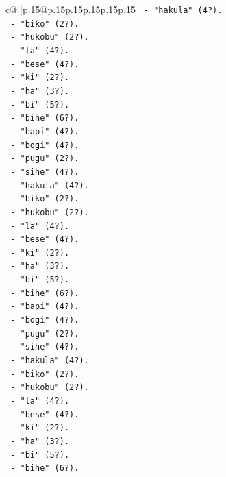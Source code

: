 \documentclass{article}
\begin{document}
{\begin{supertabular}{c@{$\;$}|p{.15\linewidth}@{}p{.15\linewidth}p{.15\linewidth}p{.15\linewidth}p{.15\linewidth}p{.15\linewidth}}
{{{\texttt{       {-} "hakula" (4?).} \\
\texttt{       {-} "biko" (2?).} \\
\texttt{       {-} "hukobu" (2?).} \\
\texttt{       {-} "la" (4?).} \\
\texttt{       {-} "bese" (4?).} \\
\texttt{       {-} "ki" (2?).} \\
\texttt{       {-} "ha" (3?).} \\
\texttt{       {-} "bi" (5?).} \\
\texttt{       {-} "bihe" (6?).} \\
\texttt{       {-} "bapi" (4?).} \\
\texttt{       {-} "bogi" (4?).} \\
\texttt{       {-} "pugu" (2?).} \\
\texttt{       {-} "sihe" (4?).} \\
\texttt{       {-} "hakula" (4?).} \\
\texttt{       {-} "biko" (2?).} \\
\texttt{       {-} "hukobu" (2?).} \\
\texttt{       {-} "la" (4?).} \\
\texttt{       {-} "bese" (4?).} \\
\texttt{       {-} "ki" (2?).} \\
\texttt{       {-} "ha" (3?).} \\
\texttt{       {-} "bi" (5?).} \\
\texttt{       {-} "bihe" (6?).} \\
\texttt{       {-} "bapi" (4?).} \\
\texttt{       {-} "bogi" (4?).} \\
\texttt{       {-} "pugu" (2?).} \\
\texttt{       {-} "sihe" (4?).} \\
\texttt{       {-} "hakula" (4?).} \\
\texttt{       {-} "biko" (2?).} \\
\texttt{       {-} "hukobu" (2?).} \\
\texttt{       {-} "la" (4?).} \\
\texttt{       {-} "bese" (4?).} \\
\texttt{       {-} "ki" (2?).} \\
\texttt{       {-} "ha" (3?).} \\
\texttt{       {-} "bi" (5?).} \\
\texttt{       {-} "bihe" (6?).} \\
}}}
\end{supertabular}}
\end{document}
